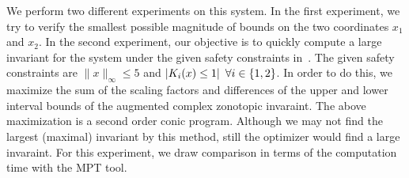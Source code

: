 
We perform two different experiments on this system.  In the first
experiment, we try to verify the smallest possible magnitude of bounds
on the two coordinates $x_1$ and $x_2$.  In the second experiment, our
objective is to quickly compute a large invariant for the system under
the given safety constraints in~\cite{TODO}.  The given safety
constraints are $\|x\|_{\infty}\leq 5$ and $\left|K_i(x)\leq
1\right|~\forall i\in\left\{1,2\right\}$.  In order to do this, we
maximize the sum of the scaling factors and differences of the
upper and lower interval bounds of the augmented complex zonotopic
invaraint.  The above maximization is a second order conic program.
Although we may not find the largest (maximal) invariant by this
method, still the optimizer would find a large invaraint.  For this
experiment, we draw comparison in terms of the computation time with
the MPT tool.

